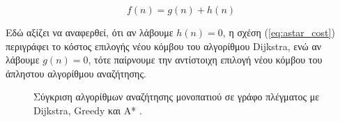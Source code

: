 \begin{equation}\label{eq:astar_cost}
	f(n) = g(n) + h(n)
\end{equation}

\bigskip
Εδώ αξίζει να αναφερθεί, ότι αν λάβουμε $h(n)=0$, η σχέση (\ref{eq:astar_cost}) περιγράφει το κόστος επιλογής νέου κόμβου του αλγορίθμου Dijkstra, ενώ αν λάβουμε $g(n)=0$, τότε παίρνουμε την αντίστοιχη επιλογή νέου κόμβου του άπληστου αλγορίθμου αναζήτησης.

\begin{figure}[!ht]
	\centering
	\caption[Σύγκριση αλγορίθμων αναζήτησης μονοπατιού σε γράφο πλέγματος Dijkstra, Greedy και A*.]{Σύγκριση αλγορίθμων αναζήτησης μονοπατιού σε γράφο πλέγματος με Dijkstra, Greedy και A* \cite{etsardou_phd}.}
	\label{fig:astar_and_dijkstra_comparison}
\end{figure}

